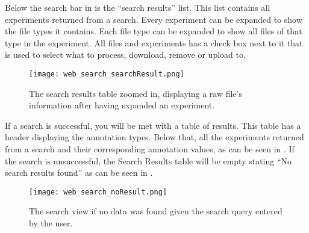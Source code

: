 Below the search bar in  is the “search results” list. This list contains all experiments returned from a search. Every experiment can be expanded to show the file types it contains. Each file type can be expanded to show all files of that type in the experiment. All files and experiments has a check box next to it that is used to select what to process, download, remove or upload to.
\begin{sidewaysfigure}[h]
\centering
\texttt{[image: web\_search\_searchResult.png]}
\caption{\label{fig:web_search_searchResult}The search results table zoomed in, displaying a raw file’s information after having expanded an experiment.}
\end{sidewaysfigure}
\FloatBarrier
If a search is successful, you will be met with a table of results. This table has a header displaying the annotation types. Below that, all the experiments returned from a search and their corresponding annotation values, as can be seen in .
If the search is unsuccessful, the Search Results table will be empty stating “No search results found” as can be seen in .
\begin{sidewaysfigure}[h]
\centering
\texttt{[image: web\_search\_noResult.png]}
\caption{\label{fig:web_search_noResult}The search view if no data was found given the search query entered by the user.}
\end{sidewaysfigure}
\FloatBarrier

\pagebreak
